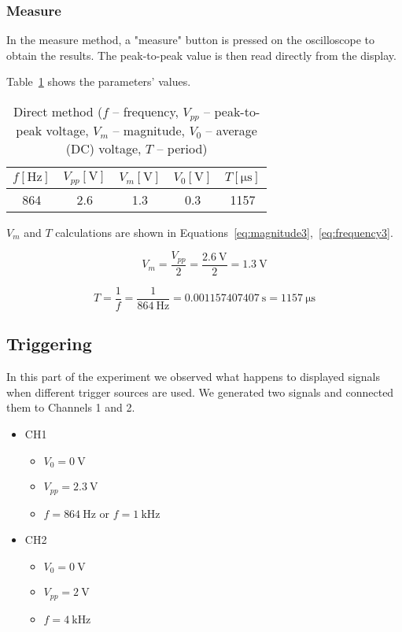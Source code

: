 \subsubsection*{Measure}

In the measure method, a "measure" button is pressed on the oscilloscope to obtain the results. The peak-to-peak value is then read directly from the display.

Table~\ref{tab:measure-method} shows the parameters' values.

\begin{table}[H]
	\centering
	\begin{tabular}{c|c|c|c|c}
		$f [\unit{\hertz}]$ & $V_{pp} [\unit{\volt}]$ & $V_{m} [\unit{\volt}]$ & $V_{0} [\unit{\volt}]$ & $T [\unit{\micro\second}]$\\
		\hline
		864 & 2.6 & 1.3 & 0.3 & 1157
	\end{tabular}
	\caption{Direct method ($f$ -- frequency, $V_{pp}$ -- peak-to-peak voltage, $V_{m}$ -- magnitude, $V_{0}$ -- average (DC) voltage, $T$ -- period)}
	\label{tab:measure-method}
\end{table}   

$V_{m}$ and $T$ calculations are shown in Equations~\ref{eq:magnitude3},~\ref{eq:frequency3}.

\begin{equation}
	V_{m} = \frac{V_{pp}}{2} = \frac{\SI{2.6}{\volt}}{2} = \SI{1.3}{\volt}
	\label{eq:magnitude3}
\end{equation}

\begin{equation}
	T = \frac{1}{f} = \frac{1}{\SI{864}{\hertz}} = \SI{0.001157407407}{\second} = \SI{1157}{\micro\second}
	\label{eq:frequency3}
\end{equation}

\subsection{Triggering}

In this part of the experiment we observed what happens to displayed signals when different trigger sources are used. We generated two signals and connected them to Channels 1 and 2.

\begin{itemize}
	\item CH1
	\begin{itemize}
		\item $V_{0} = \SI{0}{\volt}$
		\item $V_{pp} = \SI{2.3}{\volt}$
		\item $f = \SI{864}{\hertz}$ or $f = \SI{1}{\kilo\hertz}$
	\end{itemize}
	\item CH2
	\begin{itemize}
		\item $V_{0} = \SI{0}{\volt}$
		\item $V_{pp} = \SI{2}{\volt}$
		\item $f = \SI{4}{\kilo\hertz}$
	\end{itemize}
\end{itemize}

